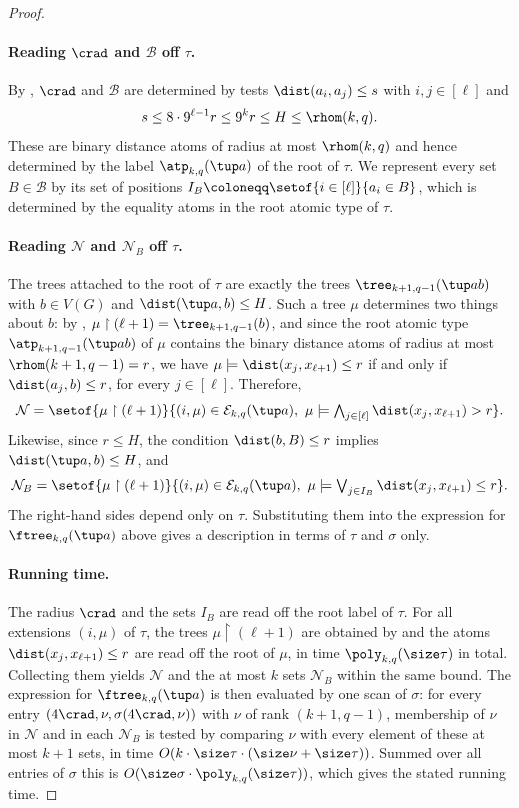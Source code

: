 \begin{proof}
\paragraph{Reading $\crad$ and $\mathcal B$ off $\tau$.}
By , $\crad$ and $\mathcal B$ are determined by tests $\dist(a_i,a_j)\le s$ with $i,j\in[\ell]$ and
\[
s\le8\cdot9^{\ell-1}r\le9^kr\le H\le\rhom(k,q).
\]
These are binary distance atoms of radius at most $\rhom(k,q)$ and hence determined by the label $\atp_{k,q}(\tup a)$ of the root of $\tau$.
We represent every set $B\in\mathcal B$ by its set of positions $I_B\coloneqq\setof{i\in[\ell]}{a_i\in B}$, which is determined by the equality atoms in the root atomic type of $\tau$.

\paragraph{Reading $\mathcal N$ and $\mathcal N_B$ off $\tau$.}
The trees attached to the root of $\tau$ are exactly
the trees $\tree_{k+1,q-1}(\tup ab)$ with $b\in V(G)$ and $\dist(\tup a,b)\le H$.
Such a tree $\mu$ determines two things about $b$: by , $\mu\restriction{(\ell+1)}=\tree_{k+1,q-1}(b)$, and since the root atomic type $\atp_{k+1,q-1}(\tup ab)$ of $\mu$ contains the binary distance atoms of radius at most $\rhom(k+1,q-1)=r$, we have $\mu\models\dist(x_{j},x_{\ell+1})\le r$ if and only if $\dist(a_{j},b)\le r$, for every $j\in[\ell]$.
Therefore,
\[
\mathcal N
=\setof{\mu\restriction{(\ell+1)}}{(i,\mu)\in\mathcal E_{k,q}(\tup a),\ \mu\models\textstyle\bigwedge_{j\in[\ell]}\dist(x_{j},x_{\ell+1})>r}.
\]
Likewise, since $r\le H$, the condition $\dist(b,B)\le r$ implies $\dist(\tup a,b)\le H$, and
\[
\mathcal N_B
=\setof{\mu\restriction{(\ell+1)}}{(i,\mu)\in\mathcal E_{k,q}(\tup a),\ \mu\models\textstyle\bigvee_{j\in I_B}\dist(x_{j},x_{\ell+1})\le r}.
\]
The right-hand sides depend only on $\tau$.
Substituting them into the expression for $\ftree_{k,q}(\tup a)$ above gives a description in terms of $\tau$ and $\sigma$ only.

\paragraph{Running time.}
The radius $\crad$ and the sets $I_B$ are read off the root label of $\tau$.
For all extensions $(i,\mu)$ of $\tau$, the trees $\mu\restriction({\ell+1})$ are obtained by  and the atoms $\dist(x_{j},x_{\ell+1})\le r$ are read off the root of $\mu$, in time $\poly_{k,q}(\size\tau)$ in total.
Collecting them yields $\mathcal N$ and the at most $k$ sets $\mathcal N_B$ within the same bound.
The expression for $\ftree_{k,q}(\tup a)$ is then evaluated by one scan of $\sigma$: for every entry $(4\crad,\nu,\sigma(4\crad,\nu))$ with $\nu$ of rank $(k+1,q-1)$, membership of $\nu$ in $\mathcal N$ and in each $\mathcal N_B$ is tested by comparing $\nu$ with every element of these at most $k+1$ sets, in time $O(k\cdot\size\tau\cdot(\size\nu+\size\tau))$.
Summed over all entries of $\sigma$ this is $O(\size\sigma\cdot\poly_{k,q}(\size\tau))$, which gives the stated running time.
\end{proof}

